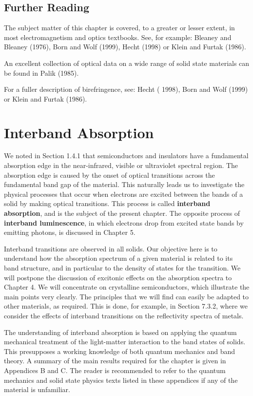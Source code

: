 \documentclass[12pt]{book}
\begin{document}
\section*{Further Reading}

The subject matter of this chapter is covered, to a greater or lesser extent, in most electromagnetism and optics textbooks. See, for example: Bleaney and Bleaney (1976), Born and Wolf (1999), Hecht (1998) or Klein and Furtak (1986).

An excellent collection of optical data on a wide range of solid state materials can be found in Palik (1985).

For a fuller description of birefringence, see: Hecht ( 1998), Born and Wolf (1999) or Klein and Furtak (1986).

\chapter{Interband Absorption}\label{chap:3}
\begin{shaded}

We noted in Section 1.4.1 that semiconductors and insulators have a fundamental absorption edge in the near-infrared, visible or ultraviolet spectral region. The absorption edge is caused by the onset of optical transitions across the fundamental band gap of the material. This naturally leads us to investigate the physical processes that occur when electrons are excited between the bands of a solid by making optical transitions. This process is called \textbf{interband absorption}, and is the subject of the present chapter. The opposite process of \textbf{interband luminescence}, in which electrons drop from excited state bands by emitting photons, is discussed in Chapter 5.

Interband transitions are observed in all solids. Our objective here is to understand how the absorption spectrum of a given material is related to its band structure, and in particular to the density of states for the transition. We will postpone the discussion of excitonic effects on the absorption spectra to Chapter 4. We will concentrate on crystalline semiconductors, which illustrate the main points very clearly. The principles that we will find can easily be adapted to other materials, as required. This is done, for example, in Section 7.3.2, where we consider the effects of interband transitions on the reflectivity spectra of metals.

The understanding of interband absorption is based on applying the quantum mechanical treatment of the light-matter interaction to the band states of solids. This presupposes a working knowledge of both quantum mechanics and band theory. A summary of the main results required for the chapter is given in Appendices B and C. The reader is recommended to refer to the quantum mechanics and solid state physics texts listed in these appendices if any of the material is unfamiliar.
\end{shaded}
\end{document}
